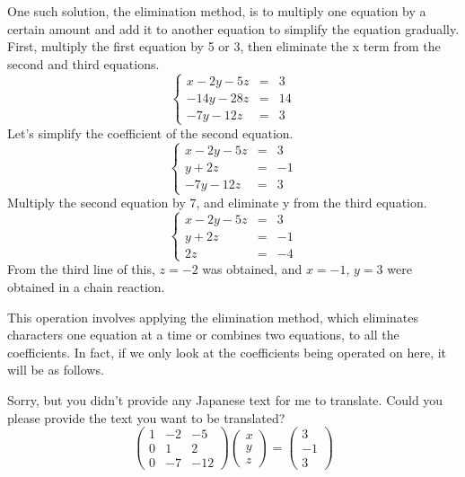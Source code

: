 \documentclass{ltjsbook}
\begin{document}
One such solution, the elimination method, is to multiply one equation by a certain amount and add it to another equation to simplify the equation gradually.
First, multiply the first equation by 5 or 3, then eliminate the x term from the second and third equations.
\[ \left \{
	\begin{array}{rcl}
		x-2y-5z  & = & 3  \\
		-14y-28z & = & 14 \\
		-7y-12z  & = & 3
	\end{array}
	\right .
\]
Let's simplify the coefficient of the second equation.
\[ \left \{
	\begin{array}{rcl}
		x-2y-5z & = & 3  \\
		y+2z    & = & -1 \\
		-7y-12z & = & 3
	\end{array}
	\right .
\]
Multiply the second equation by 7, and eliminate y from the third equation.
\[ \left \{
	\begin{array}{rcl}
		x-2y-5z & = & 3  \\
		y+2z    & = & -1 \\
		2z      & = & -4
	\end{array}
	\right .
\]
From the third line of this, $z=-2$ was obtained, and $x=-1$, $y=3$ were obtained in a chain reaction.


This operation involves applying the elimination method, which eliminates characters one equation at a time or combines two equations, to all the coefficients. In fact, if we only look at the coefficients being operated on here, it will be as follows.

Sorry, but you didn't provide any Japanese text for me to translate. Could you please provide the text you want to be translated?
\[
	\begin{pmatrix} 1 & -2 & -5  \\
                0 & 1  & 2   \\
                0 & -7 & -12\end{pmatrix}
	\begin{pmatrix} x \\ y \\ z \end{pmatrix}
	=
	\begin{pmatrix} 3 \\ -1 \\ 3 \end{pmatrix}
\]
\end{document}
